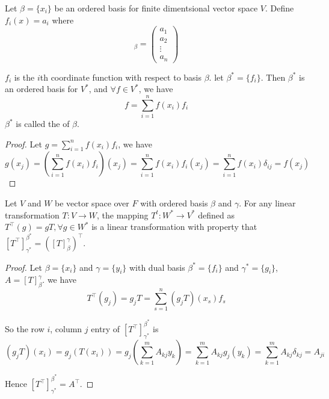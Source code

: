 \begin{definition}
	Let $\beta = \{ x_i\}$ be an ordered basis for finite dimentsional vector space $V$. Define $f_i (x) = a_i$ where
	\begin{equation*}
	    [x]_\beta = \begin{pmatrix}
	        a_1 \\
	        a_2 \\
	        \vdots \\
	        a_n
	    \end{pmatrix}
	\end{equation*}
	
	$f_i$ is the $i$th coordinate function with respect to basis $\beta$. let $\beta^*=\{f_i\}$. Then $\beta^*$ is an ordered basis for $V^*$, and $\forall f \in V^*$, we have
	\begin{equation}
		f = \sum_{i=1}^n f(x_i) f_i
	\end{equation}
	$\beta^*$ is called the  of $\beta$.
\end{definition}
\begin{proof}
	Let $g =\displaystyle \sum_{i=1}^n f(x_i) f_i$, we have
	\begin{equation*}
	g(x_j) = \left( \sum_{i=1}^n f(x_i) f_i \right) (x_j) = \sum_{i=1}^n f(x_i) f_i (x_j) = \sum_{i=1}^n f(x_i) \delta_{ij} =f(x_j)
	\end{equation*}
\end{proof}


\begin{theorem}
	Let $V$ and $W$ be vector space over $F$ with ordered basis $\beta$ and $\gamma$. For any linear transformation $T:V \rightarrow W$, the mapping $T^t: W^* \rightarrow V^*$ defined as $T^\top (g) = gT, \forall g \in W^*$ is a linear transformation with property that $\left[T^\top \right]_{\gamma^*}^{\beta^*} = \left(\left[T \right]_\beta^\gamma \right)^\top$.
\end{theorem}
\begin{proof}
	Let $\beta = \{x_i\}$ and $\gamma=\{y_i\}$ with dual basis $\beta^*=\{f_i\}$ and $\gamma^*=\{g_i\}$, $A=[T]_\beta^\gamma$. we have
	\begin{equation*}
		T^\top (g_j) = g_j T = \sum_{s=1}^n (g_j T) (x_s) f_s
	\end{equation*}
	
	So the row $i$, column $j$ entry of $[T^\top]_{\gamma^*}^{\beta^*}$ is
	\begin{equation*}
	(g_j T)(x_i) = g_j (T(x_i))= g_j \left( \sum_{k=1}^m A_{kj} y_k \right) = \sum_{k=1}^m A_{kj} g_j(y_k)= \sum_{k=1}^m A_{kj} \delta_{kj} = A_{ji}
	\end{equation*}
	
	Hence $\left[T^\top \right]_{\gamma^*}^{\beta^*} = A^\top $.
\end{proof}

